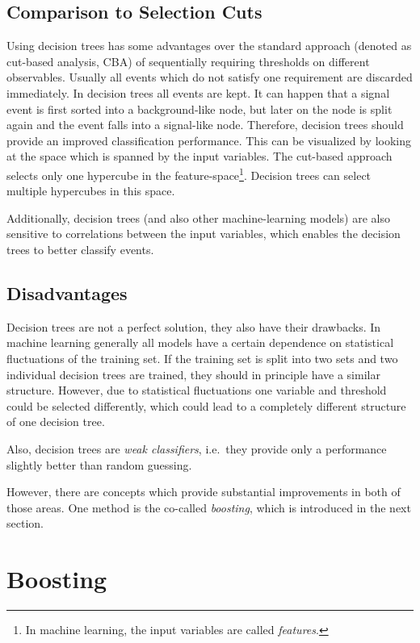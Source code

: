 \subsection{Comparison to Selection Cuts}\label{sub:bdt:dt:comparison}

Using decision trees has some advantages over the standard approach (denoted as cut-based analysis, CBA) of sequentially requiring thresholds on different
observables.
Usually all events which do not satisfy one requirement are discarded immediately.
In decision trees all events are kept.
It can happen that a signal event is first sorted into a background-like node, but later on the node is split again and
the event falls into a signal-like node.
Therefore, decision trees should provide an improved classification performance.
This can be visualized by looking at the space which is spanned by the input variables.
The cut-based approach selects only one hypercube in the
feature-space\footnote{In machine learning, the input variables are called \emph{features}.}.
Decision trees can select multiple hypercubes in this space.

Additionally, decision trees (and also other machine-learning models) are also sensitive to correlations
between the input variables, which enables the decision trees to better classify events.

\subsection{Disadvantages}\label{sub:bdt:dt:disadvantages}

Decision trees are not a perfect solution, they also have their drawbacks.
In machine learning generally all models have a certain dependence on statistical fluctuations of the training set.
If the training set is split into two sets and two individual decision trees are trained, they should in principle have
a similar structure.
However, due to statistical fluctuations one variable and threshold could be selected differently, which could lead
to a completely different structure of one decision tree.

Also, decision trees are \emph{weak classifiers}, i.e.\ they provide only a performance slightly better than random guessing.

However, there are concepts which provide substantial improvements in both of those areas.
One method is the co-called \emph{boosting}, which is introduced in the next section.

\section{Boosting}\label{sec:bdt:boosting}

